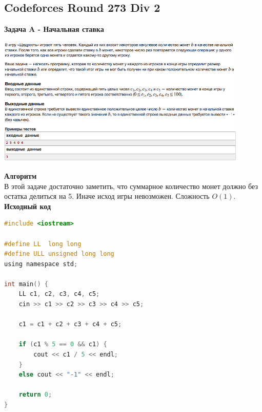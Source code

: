 \documentclass[a4paper,12pt]{article}
\begin{document}
%
%

\newpage
\subsection{Codeforces Round 273 Div 2}

\textbf{{\large Задача A - Начальная ставка}} \\
\begin{center}
\includegraphics[width=0.9\textwidth]{C_273/C_273_A.png}\\ [1cm]
\end{center}
\textbf{{\large Алгоритм}} \\
В этой задаче достаточно заметить, что суммарное количество монет должно без остатка делиться на 5. Иначе исход игры невозможен. Сложность $O(1)$.\\

\textbf{{\large Исходный код}}
\begin{lstlisting}[language=C]
#include <iostream>

#define LL  long long
#define ULL unsigned long long
using namespace std;

int main() {
    LL c1, c2, c3, c4, c5;
    cin >> c1 >> c2 >> c3 >> c4 >> c5;
    
    c1 = c1 + c2 + c3 + c4 + c5;
    
    if (c1 % 5 == 0 && c1) {
        cout << c1 / 5 << endl;
    }
    else cout << "-1" << endl;

    return 0;
}
\end{lstlisting}
\end{document}
